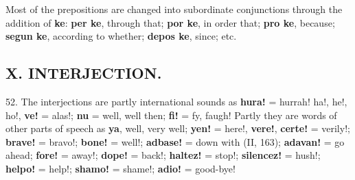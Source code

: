 Most of the prepositions are changed into subordinate conjunctions through the addition of \textbf{ke}: \textbf{per ke}, through that; \textbf{por ke}, in order that; \textbf{pro ke}, because; \textbf{segun ke}, according to whether; \textbf{depos ke}, since; etc.

\subsection*{X. INTERJECTION.}
52. The interjections are partly international sounds as \textbf{hura!} = hurrah! ha!, he!, ho!, \textbf{ve!} = alas!; \textbf{nu} = well, well then; \textbf{fi!} = fy, faugh! Partly they are words of other parts of speech as \textbf{ya}, well, very well; \textbf{yen!} = here!, \textbf{vere!}, \textbf{certe!} = verily!; \textbf{brave!} = bravo!; \textbf{bone!} = well!; \textbf{adbase!} = down with (II, 163); \textbf{adavan!} = go ahead; \textbf{fore!} = away!; \textbf{dope!} = back!; \textbf{haltez!} = stop!; \textbf{silencez!} = hush!; \textbf{helpo!} = help!; \textbf{shamo!} = shame!; \textbf{adio!} = good-bye! 